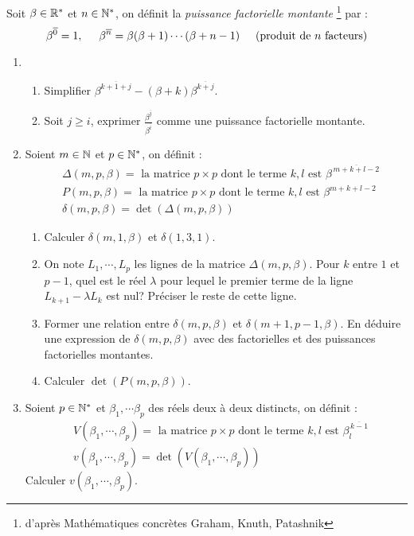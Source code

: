 Soit $\beta\in \mathbb{R}^*$ et $n\in \mathbb{N}^*$, on définit la \emph{puissance factorielle montante} \footnote{d'après Mathématiques concrètes Graham, Knuth, Patashnik} par :
\begin{displaymath}
 \beta^{\overline{0}} = 1,\hspace{0.5cm}
\beta^{\overline{n}} = \beta (\beta +1)\cdots (\beta + n-1)
\hspace{0.5cm}\text{(produit de $n$ facteurs)}
\end{displaymath}
\begin{enumerate}
\item 
\begin{enumerate}
 \item Simplifier $\beta^{\overline{k+1+j}}-(\beta+k)\beta^{\overline{k+j}}$.
 \item Soit $j\geq i$, exprimer $\frac{\beta^{\overline{j}}}{\beta^{\overline{i}}}$ comme une puissance factorielle montante.
\end{enumerate}

 \item Soient $m\in \mathbb{N}$ et $p\in \mathbb{N}^*$, on définit :
\begin{align*}
&\Delta(m,p,\beta) = \text{ la matrice $p\times p$ dont le terme $k,l$ est } \beta^{\,\overline{m+k+l-2}}\\
&P(m,p,\beta) = \text{ la matrice $p\times p$ dont le terme $k,l$ est } \beta^{m+k+l-2}\\
& \delta(m,p,\beta)=\det (\Delta(m,p,\beta))
\end{align*}

\begin{enumerate}
 \item Calculer $\delta(m,1,\beta)$ et $\delta(1,3,1)$.
 \item On note $L_1,\cdots, L_p$ les lignes de la matrice $\Delta(m,p,\beta)$.\newline
Pour $k$ entre $1$ et $p-1$, quel est le réel $\lambda$ pour lequel le premier terme de la ligne $L_{k+1}-\lambda L_k$ est nul? Préciser le reste de cette ligne.

 \item Former une relation entre $\delta(m,p,\beta)$ et $\delta(m+1,p-1,\beta)$. En déduire une expression de $\delta(m,p,\beta)$ avec des factorielles et des puissances factorielles montantes.
 \item Calculer $\det(P(m,p,\beta))$.
\end{enumerate}

\item  Soient $p\in \mathbb{N}^*$ et $\beta_1,\cdots \beta_p$ des réels deux à deux distincts, on définit :
\begin{align*}
&V(\beta_1,\cdots,\beta_p) = \text{ la matrice $p\times p$ dont le terme $k,l$ est } \beta_l^{\,\overline{k-1}}\\
& v(\beta_1,\cdots,\beta_p)=\det (V(\beta_1,\cdots,\beta_p))
\end{align*}
Calculer $v(\beta_1,\cdots,\beta_p)$.
\end{enumerate}
